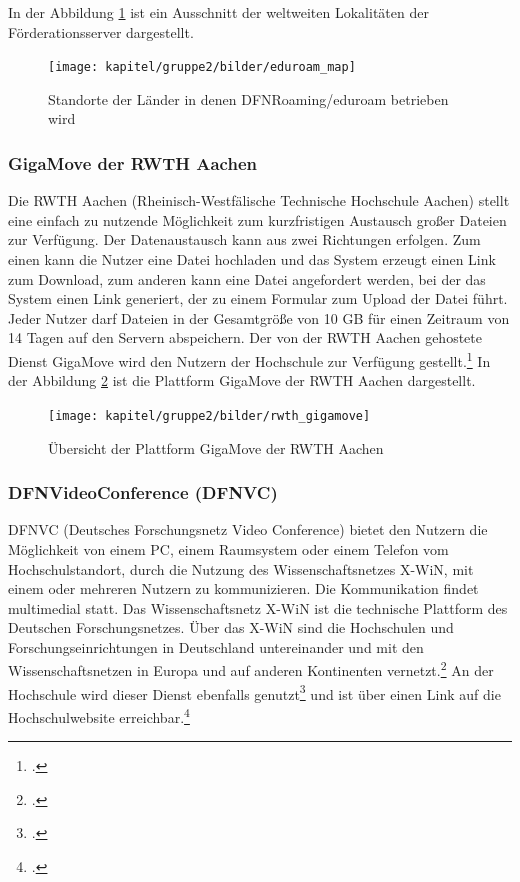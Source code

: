 In der Abbildung \ref{fig_map_eduroam} ist ein Ausschnitt der weltweiten Lokalitäten der Förderationsserver dargestellt.

\begin{figure}[h!]
	\centering
	\texttt{[image: kapitel/gruppe2/bilder/eduroam\_map]}
	\caption{Standorte der Länder in denen DFNRoaming/eduroam betrieben wird \protect\footnotemark}
	\label{fig_map_eduroam}
\end{figure}

\subsubsection{GigaMove der RWTH Aachen}
\label{gigamove_rwth_aachen}
Die RWTH Aachen (Rheinisch-Westfälische Technische Hochschule Aachen) stellt eine einfach zu nutzende Möglichkeit zum kurzfristigen Austausch großer Dateien zur Verfügung. Der Datenaustausch kann aus zwei Richtungen erfolgen. Zum einen kann die Nutzer eine Datei hochladen und das System erzeugt einen Link zum Download, zum anderen kann eine Datei angefordert werden, bei der das System einen Link generiert, der zu einem Formular zum Upload der Datei führt. Jeder Nutzer darf Dateien in der Gesamtgröße von 10 GB für einen Zeitraum von 14 Tagen auf den Servern abspeichern. Der von der RWTH Aachen gehostete Dienst GigaMove wird den Nutzern der Hochschule zur Verfügung gestellt.\footcite{hsel_servicelinks_2015} In der Abbildung \ref{fig_rwth_gigamove} ist die Plattform GigaMove der RWTH Aachen dargestellt.

\begin{figure}
	\centering
	\texttt{[image: kapitel/gruppe2/bilder/rwth\_gigamove]}
	\caption{Übersicht der Plattform GigaMove der RWTH Aachen \protect\footnotemark}
	\label{fig_rwth_gigamove}
\end{figure}

\subsubsection{DFNVideoConference (DFNVC)}
DFNVC (Deutsches Forschungsnetz Video Conference) bietet den Nutzern die Möglichkeit von einem PC, einem Raumsystem oder einem Telefon vom Hochschulstandort, durch die Nutzung des Wissenschaftsnetzes X-WiN, mit einem oder mehreren Nutzern zu kommunizieren. Die Kommunikation findet multimedial statt. Das Wissenschaftsnetz X-WiN ist die technische Plattform des Deutschen Forschungsnetzes. Über das X-WiN sind die Hochschulen und Forschungseinrichtungen in Deutschland untereinander und mit den Wissenschaftsnetzen in Europa und auf anderen Kontinenten vernetzt.\footcite[Vgl.][]{dfn_DFNVideoConference_2014} An der Hochschule wird dieser Dienst ebenfalls genutzt\footcite{hsel_shibboleth_auth_2015} und ist über einen Link auf die Hochschulwebsite erreichbar.\footcite{dfn_DFNVC_Webkonferenzen_2015}


